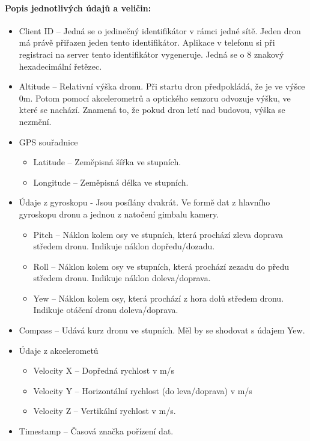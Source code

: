 \paragraph{\textnormal{Popis jednotlivých údajů a veličin:}}
\begin{itemize}
    \item Client ID -- Jedná se o jedinečný identifikátor v rámci jedné sítě. Jeden dron má právě přiřazen jeden tento identifikátor. Aplikace v telefonu si při registraci na server tento identifikátor vygeneruje. Jedná se o 8 znakový hexadecimální řetězec.
    \item  Altitude -- Relativní výška dronu. Při startu dron předpokládá, že je ve výšce 0m. Potom pomocí akcelerometrů a optického senzoru odvozuje výšku, ve které se nachází. Znamená to, že pokud dron letí nad budovou, výška se nezmění.
    \item GPS souřadnice
    \begin{itemize}
        \item Latitude -- Zeměpisná šířka ve stupních.
        \item Longitude -- Zeměpisná délka ve stupních.
    \end{itemize}

    \item Údaje z gyroskopu - Jsou posílány dvakrát. Ve formě dat z hlavního gyroskopu dronu a jednou z natočení gimbalu kamery. %
    \begin{itemize}
        \item Pitch -- Náklon kolem osy  ve stupních, která prochází zleva doprava středem dronu. Indikuje náklon dopředu/dozadu.
        \item Roll --  Náklon kolem osy  ve stupních, která prochází zezadu do předu středem dronu. Indikuje náklon doleva/doprava.
        \item Yew -- Náklon kolem osy, která prochází z hora dolů  středem dronu. Indikuje otáčení dronu doleva/doprava.
    \end{itemize}
    \item Compass -- Udává kurz dronu ve stupních. Měl by se shodovat s údajem Yew.
    \item Údaje z akcelerometů
    \begin{itemize}
        \item Velocity X -- Dopředná rychlost v m/s
        \item Velocity Y -- Horizontální rychlost (do leva/doprava) v m/s
        \item Velocity Z -- Vertikální rychlost v m/s.
     \end{itemize}
     \item Timestamp -- Časová značka pořízení dat.
\end{itemize}

